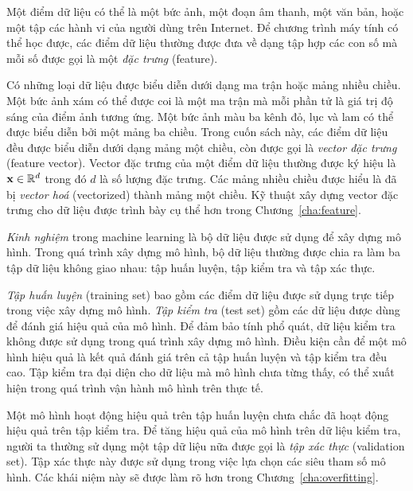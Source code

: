 Một điểm dữ liệu có thể là một bức ảnh, một đoạn âm thanh, một văn bản, hoặc một
tập các hành vi của người dùng trên Internet. Để chương trình máy tính có thể
học được, các điểm dữ liệu thường được đưa về dạng tập hợp các con số mà mỗi số
được gọi là một \textit{đặc trưng} (feature).


Có những loại dữ liệu được biểu diễn dưới dạng ma trận hoặc mảng nhiều chiều.
Một bức ảnh xám có thể được coi là một ma trận mà mỗi phần tử là giá trị độ sáng
của điểm ảnh tương ứng. Một bức ảnh màu ba kênh đỏ, lục và lam có thể được biểu
diễn bởi một mảng ba chiều. Trong cuốn sách này, các điểm dữ liệu đều được biểu
diễn dưới dạng mảng một chiều, còn được gọi là \textit{vector đặc trưng} (feature vector). Vector đặc trưng của một điểm dữ liệu thường được ký hiệu là $\mathbf{x} \in \mathbb{R}^d$ trong đó $d$ là số lượng đặc trưng. Các mảng nhiều chiều được hiểu là đã bị \textit{vector hoá} (vectorized) thành mảng một chiều. Kỹ thuật xây dựng vector đặc trưng cho dữ liệu được trình bày cụ thể hơn trong Chương~\ref{cha:feature}.

\textit{Kinh nghiệm} trong machine learning là bộ dữ liệu được sử dụng để xây
dựng mô hình. Trong quá trình xây dựng mô hình, bộ dữ liệu thường được chia ra
làm ba tập dữ liệu không giao nhau: tập huấn luyện, tập kiểm tra và tập xác thực.




\textit{Tập huấn luyện} (training set) bao gồm các điểm dữ liệu được sử dụng trực tiếp trong việc xây dựng mô hình. \textit{Tập kiểm tra} (test set) gồm các dữ liệu được dùng để đánh giá hiệu quả của mô hình. Để đảm bảo tính phổ quát, dữ liệu kiểm tra không được sử dụng trong quá trình xây dựng mô hình. Điều kiện cần để một mô hình hiệu quả là kết quả đánh giá trên cả tập huấn luyện và tập kiểm tra đều cao. Tập kiểm tra đại diện cho dữ liệu mà mô hình chưa từng thấy, có thể xuất hiện trong quá trình vận hành mô hình trên thực tế.

Một mô hình hoạt động hiệu quả trên tập huấn luyện chưa chắc đã hoạt động hiệu quả trên tập kiểm tra. Để tăng hiệu quả của mô hình trên dữ liệu kiểm tra, người ta thường sử dụng một tập dữ liệu nữa được gọi là \textit{tập xác thực} (validation set). Tập xác thực này được sử dụng trong việc lựa chọn các siêu tham số mô hình. Các khái niệm này sẽ được làm rõ hơn trong Chương~\ref{cha:overfitting}.


